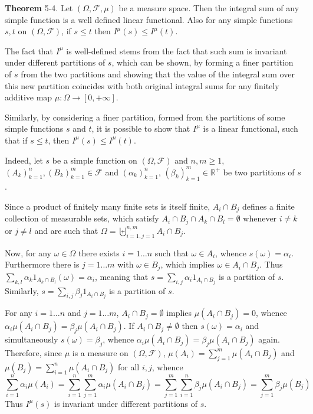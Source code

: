 \documentclass[a4paper]{article}
\newcommand{\clo}[1]{\left [ #1 \right ]}
\newcommand{\brac}[1]{\left ( #1 \right )}
\newcommand{\Real}{\mathbb{R}}
\newcommand{\Zinf}{\clo{ 0, +\infty }}
\newcommand{\Fcal}{\mathcal{F}}
\begin{document}
\label{thm:simple_int} \noindent \textbf{Theorem} 5-4.
Let $\brac{\Omega, \Fcal, \mu}$ be a measure space. Then the integral sum of any simple function is a well defined linear functional. Also for any simple functions $s,t$ on $\brac{\Omega, \Fcal}$, if $s\leq t$ then $I^\mu\brac{s}\leq I^\mu\brac{t}$.

The fact that $I^\mu$ is well-defined stems from the fact that such sum is invariant under different partitions of $s$, which can be shown, by forming a finer partition of $s$ from the two partitions and showing that the value of the integral sum over this new partition coincides with both original integral sums for any finitely additive map $\mu:\Omega\to\Zinf$.

Similarly, by considering a finer partition, formed from the partitions of some simple functions $s$ and $t$, it is possible to show that $I^\mu$ is a linear functional, such that if $s\leq t$, then $I^\mu\brac{s}\leq I^\mu\brac{t}$.

Indeed, let $s$ be a simple function on $\brac{\Omega, \Fcal}$ and $n,m\geq1$, $\brac{A_k}_{k=1}^n, \brac{B_k}_{k=1}^m\in \Fcal$ and $\brac{\alpha_k}_{k=1}^n$, $\brac{\beta_k}_{k=1}^m\in \Real^+$ be two partitions of $s$.

Since a product of finitely many finite sets is itself finite, $A_i\cap B_j$ defines a finite collection of measurable sets, which satisfy $A_i\cap B_j\cap A_k\cap B_l=\emptyset$ whenever $i\neq k$ or $j\neq l$ and are such that $\Omega = \biguplus_{i=1,j=1}^{n,m} A_i\cap B_j$.

Now, for any $\omega\in\Omega$ there exists $i=1\ldots n$ such that $\omega\in A_i$, whence $s\brac{\omega}=\alpha_i$. Furthermore there is $j=1\ldots m$ with $\omega\in B_j$, which implies $\omega\in A_i\cap B_j$. Thus $\sum_{k,l} \alpha_k 1_{A_k\cap B_l}\brac{\omega}=\alpha_i$, meaning that $s=\sum_{i,j} \alpha_i 1_{A_i\cap B_j}$ is a partition of $s$. Similarly, $s=\sum_{i,j} \beta_j 1_{A_i\cap B_j}$ is a partition of $s$.

For any $i=1\ldots n$ and $j=1\ldots m$, $A_i\cap B_j = \emptyset$ implies $\mu\brac{A_i\cap B_j} = 0$, whence $\alpha_i\mu\brac{A_i\cap B_j}=\beta_j\mu\brac{A_i\cap B_j}$. If $A_i\cap B_j\neq \emptyset$ then $s\brac{\omega}=\alpha_i$ and simultaneously $s\brac{\omega}=\beta_j$, whence $\alpha_i\mu\brac{A_i\cap B_j}=\beta_j\mu\brac{A_i\cap B_j}$ again. Therefore, since $\mu$ is a measure on $\brac{\Omega, \Fcal}$, $\mu\brac{A_i}=\sum_{j=1}^m \mu\brac{A_i\cap B_j}$ and $\mu\brac{B_j}=\sum_{i=1}^n \mu\brac{A_i\cap B_j}$ for all $i,j$, whence \[\sum_{i=1}^n \alpha_i \mu\brac{A_i} = \sum_{i=1}^n \sum_{j=1}^m \alpha_i \mu\brac{A_i\cap B_j} = \sum_{j=1}^m \sum_{i=1}^n \beta_j \mu\brac{A_i\cap B_j} = \sum_{j=1}^m\beta_j \mu\brac{B_j}\] Thus $I^\mu\brac{s}$ is invariant under different partitions of $s$.
\end{document}

